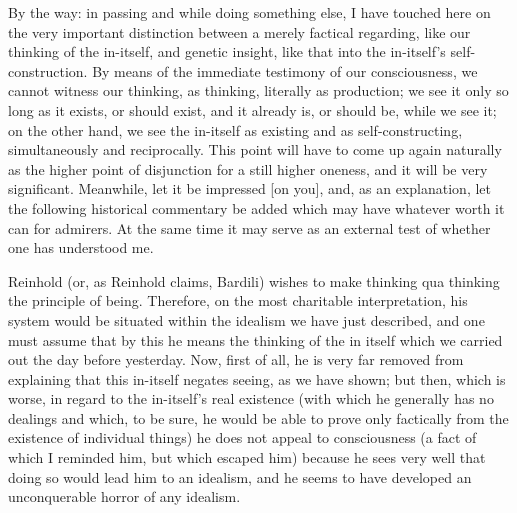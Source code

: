 By the way: in passing and while doing something else,
I have touched here on the very important distinction
between a merely factical regarding,
like our thinking of the in-itself,
and genetic insight,
like that into the in-itself's self-construction.
By means of the immediate testimony of our consciousness,
we cannot witness our thinking, as thinking,
literally as production;
we see it only so long as it exists,
or should exist, and it already is, or should be, while we see it;
on the other hand, we see the in-itself as
existing and as self-constructing,
simultaneously and reciprocally.
This point will have to come up again naturally
as the higher point of disjunction
for a still higher oneness,
and it will be very significant.
Meanwhile, let it be impressed [on you],
and, as an explanation,
let the following historical commentary be added
which may have whatever worth it can for admirers.
At the same time it may serve as an external test
of whether one has understood me.

Reinhold (or, as Reinhold claims, Bardili) wishes
to make thinking qua thinking the principle of being.
Therefore, on the most charitable interpretation,
his system would be situated within
the idealism we have just described,
and one must assume that by this he means
the thinking of the in itself
which we carried out the day before yesterday.
Now, first of all, he is very far removed from
explaining that this in-itself negates seeing,
as we have shown;
but then, which is worse,
in regard to the in-itself's real existence
(with which he generally has no dealings
and which, to be sure, he would be able to prove
only factically from the existence of individual things)
he does not appeal to consciousness
(a fact of which I reminded him, but which escaped him)
because he sees very well that doing so
would lead him to an idealism,
and he seems to have developed
an unconquerable horror of any idealism.

